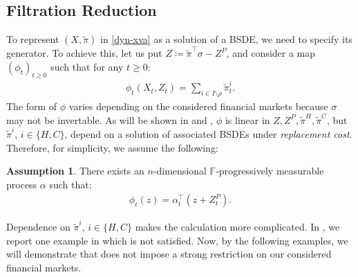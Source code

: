\documentclass[a4paper, 11pt]{article}              %
\numberwithin{equation}{section}
\theoremstyle{plain}
\newcommand{\1}{\mathds{1}}
\newcommand{\pit}{\tilde{\pi}}
\newcommand{\dsF}{\mathbb{F}}
\newcommand{\SUM}{\displaystyle\sum}
\theoremstyle{plain}
\newtheorem{assumption}[thm]{Assumption}
\theoremstyle{definition}
\newtheorem{assumption}{Assumption}
\theoremstyle{plain}
\begin{document}
\subsection{Filtration Reduction}
\label{sec:bsde}
To represent $(X, \pit)$ in \cref{dyn-xva} as a solution of a BSDE, we need to
specify its generator. To achieve this, let us  put $Z\coloneqq
\pit^\top\sigma - Z^P$, and consider a map $(\phi_t)_{t\geq0}$ such that
 for any $t \geq 0 $:
\begin{align}
\phi_t(X_t, Z_t) = \SUM_{i \in I \setminus \rho}\tilde{\pi}^i_t. \nonumber    
\end{align}
The form of $\phi$ varies depending on the considered financial markets because
$\sigma$ may not be invertable. As will be shown in  and
, $\phi$ is linear in $Z, Z^P, \pit^H, \pit^C$, but
$\tilde{\pi}^i$, $i \in \{H, C\}$, depend on a solution of associated BSDEs
under \textit{replacement cost}.  Therefore, for simplicity, we assume the following:
\begin{assumption}\label{assm:generator}
  There exists an $n$-dimensional $\dsF$-progressively measurable process
  $\alpha$ such that:
 \begin{align}
   \phi_t(z) = \alpha^\top_t(z +  Z^P_t).\nonumber 
 \end{align}
\end{assumption}
Dependence on $\pit^i$, $i\in \{H, C\}$ makes the calculation
more complicated. In , we report one example in which 
 is not satisfied. Now, by the following examples, we will
demonstrate that  does not impose a  strong restriction on our
considered financial markets.
\end{document}
